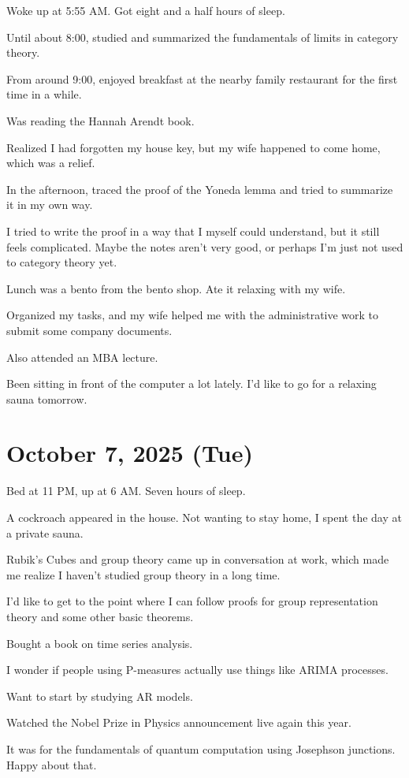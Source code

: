 \documentclass[uplatex]{jsarticle}
\begin{document}
Woke up at 5:55 AM. Got eight and a half hours of sleep.

Until about 8:00, studied and summarized the fundamentals of limits in category theory.

From around 9:00, enjoyed breakfast at the nearby family restaurant for the first time in a while.

Was reading the Hannah Arendt book.

Realized I had forgotten my house key, but my wife happened to come home, which was a relief.

In the afternoon, traced the proof of the Yoneda lemma and tried to summarize it in my own way.

I tried to write the proof in a way that I myself could understand, but it still feels complicated. Maybe the notes aren't very good, or perhaps I'm just not used to category theory yet.

Lunch was a bento from the bento shop. Ate it relaxing with my wife.

Organized my tasks, and my wife helped me with the administrative work to submit some company documents.

Also attended an MBA lecture.

Been sitting in front of the computer a lot lately. I'd like to go for a relaxing sauna tomorrow.

\section{October 7, 2025 (Tue)}

Bed at 11 PM, up at 6 AM. Seven hours of sleep.

A cockroach appeared in the house. Not wanting to stay home, I spent the day at a private sauna.

Rubik's Cubes and group theory came up in conversation at work, which made me realize I haven't studied group theory in a long time.

I'd like to get to the point where I can follow proofs for group representation theory and some other basic theorems.

Bought a book on time series analysis.

I wonder if people using P-measures actually use things like ARIMA processes.

Want to start by studying AR models.

Watched the Nobel Prize in Physics announcement live again this year.

It was for the fundamentals of quantum computation using Josephson junctions. Happy about that.
\end{document}
